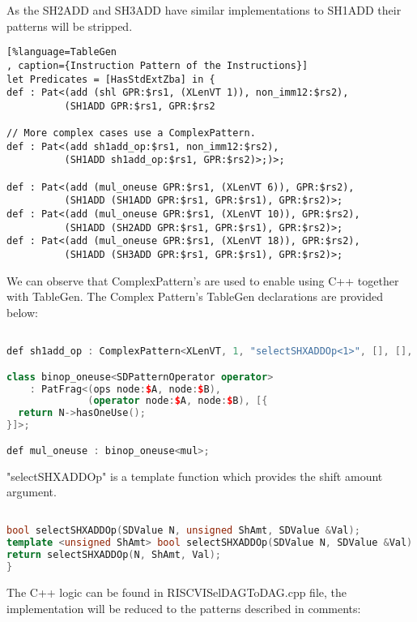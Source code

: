 As the SH2ADD and SH3ADD have similar implementations to SH1ADD their patterns will be stripped.

\begin{lstlisting}[%language=TableGen
, caption={Instruction Pattern of the Instructions}]
let Predicates = [HasStdExtZba] in {
def : Pat<(add (shl GPR:$rs1, (XLenVT 1)), non_imm12:$rs2),
          (SH1ADD GPR:$rs1, GPR:$rs2

// More complex cases use a ComplexPattern.
def : Pat<(add sh1add_op:$rs1, non_imm12:$rs2),
          (SH1ADD sh1add_op:$rs1, GPR:$rs2)>;)>;

def : Pat<(add (mul_oneuse GPR:$rs1, (XLenVT 6)), GPR:$rs2),
          (SH1ADD (SH1ADD GPR:$rs1, GPR:$rs1), GPR:$rs2)>;
def : Pat<(add (mul_oneuse GPR:$rs1, (XLenVT 10)), GPR:$rs2),
          (SH1ADD (SH2ADD GPR:$rs1, GPR:$rs1), GPR:$rs2)>;
def : Pat<(add (mul_oneuse GPR:$rs1, (XLenVT 18)), GPR:$rs2),
          (SH1ADD (SH3ADD GPR:$rs1, GPR:$rs1), GPR:$rs2)>;
\end{lstlisting}

We can observe that ComplexPattern's  are used to enable using C++ together with TableGen. The Complex Pattern's TableGen declarations are provided below:

\begin{lstlisting}[language=C++, caption={TableGen Declaration of ComplexPatterns}]

def sh1add_op : ComplexPattern<XLenVT, 1, "selectSHXADDOp<1>", [], [], 6>;

class binop_oneuse<SDPatternOperator operator>
    : PatFrag<(ops node:$A, node:$B),
              (operator node:$A, node:$B), [{
  return N->hasOneUse();
}]>;

def mul_oneuse : binop_oneuse<mul>;
\end{lstlisting}

"selectSHXADDOp" is a template function which provides the shift amount argument.

\begin{lstlisting}[language=C++, caption={Template Function of the ComplexPattern for "sh1add\_op"}]

bool selectSHXADDOp(SDValue N, unsigned ShAmt, SDValue &Val);
template <unsigned ShAmt> bool selectSHXADDOp(SDValue N, SDValue &Val) {
return selectSHXADDOp(N, ShAmt, Val);
}
\end{lstlisting}

The C++ logic can be found in RISCVISelDAGToDAG.cpp file, the implementation will be reduced to the patterns described in comments:

